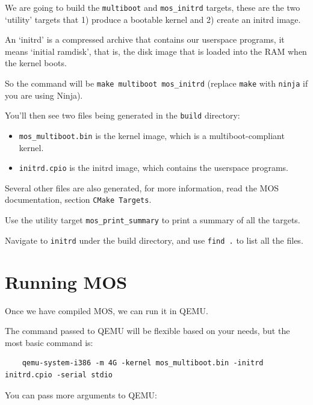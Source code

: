 We are going to build the \texttt{multiboot} and \texttt{mos\_initrd} targets, these are the two
`utility' targets that 1) produce a bootable kernel and 2) create an initrd image.

An `initrd' is a compressed archive that contains our userspace programs, it means `initial ramdisk',
that is, the disk image that is loaded into the RAM when the kernel boots.

So the command will be \texttt{make multiboot mos\_initrd} (replace \texttt{make} with \texttt{ninja} if you are using Ninja).

You'll then see two files being generated in the \texttt{build} directory:

\begin{itemize}
    \item \texttt{mos\_multiboot.bin} is the kernel image, which is a multiboot-compliant kernel.
    \item \texttt{initrd.cpio} is the initrd image, which contains the userspace programs.
\end{itemize}

Several other files are also generated, for more information, read the MOS documentation, section \texttt{CMake Targets}.

\begin{exercise}
    \item Use the utility target \texttt{mos\_print\_summary} to print a summary of all the targets.
    \item Navigate to \texttt{initrd} under the build directory, and use \texttt{find .} to list all the files.
\end{exercise}

\section{Running MOS}

Once we have compiled MOS, we can run it in QEMU.

The command passed to QEMU will be flexible based on your needs, but the most basic command is:

\begin{verbatim}
    qemu-system-i386 -m 4G -kernel mos_multiboot.bin -initrd initrd.cpio -serial stdio
\end{verbatim}

You can pass more arguments to QEMU:

